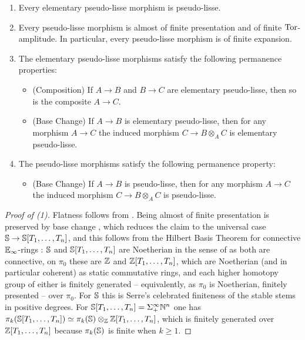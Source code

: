 \begin{proposition}\label{prop: properties of pseudo-lisse morphisms}
    \begin{enumerate}
        \item Every elementary pseudo-lisse morphism is pseudo-lisse. 
        \item Every pseudo-lisse morphism is almost of finite presentation and of finite $\mathrm{Tor}$-amplitude. In particular, every pseudo-lisse morphism is of finite expansion. 
        \item The elementary pseudo-lisse morphisms satisfy the following permanence properties: 
        \begin{itemize}
            \item [(3.1)] (Composition) If $A\to B$ and $B\to C$ are elementary pseudo-lisse, then so is the composite $A\to C$. 
            \item [(3.2)] (Base Change) If $A\to B$ is elementary pseudo-lisse, then for any morphism $A\to C$ the induced morphism $C\to B\otimes_{A}C$ is elementary pseudo-lisse. 
        \end{itemize}
        \item The pseudo-lisse morphisms satisfy the following permanence property: 
        \begin{itemize}
            \item [(4.1)] (Base Change) If $A\to B$ is pseudo-lisse, then for any morphism $A\to C$ the induced morphism $C\to B\otimes_{A}C$ is pseudo-lisse. 
        \end{itemize}
    \end{enumerate}
\end{proposition}
\begin{proof}[Proof of (1)]
    Flatness follows from \cite[Rmk. 5.4.1.2]{SAG}. Being almost of finite presentation is preserved by base change \cite[Rmk. 7.2.4.28]{HA}, which reduces the claim to the universal case $\mathbb{S}\to\mathbb{S}[T_{1},\dots,T_{n}]$, and this follows from the Hilbert Basis Theorem for connective $\mathbb{E}_{\infty}$-rings \cite[Prop. 7.2.4.31]{HA}: $\mathbb{S}$ and $\mathbb{S}[T_{1},\dots,T_{n}]$ are Noetherian in the sense of \cite[Def. 7.2.4.30]{HA} as both are connective, on $\pi_{0}$ these are $\mathbb{Z}$ and $\mathbb{Z}[T_{1},\dots,T_{n}]$, which are Noetherian (and in particular coherent) as static commutative rings, and each higher homotopy group of either is finitely generated -- equivalently, as $\pi_{0}$ is Noetherian, finitely presented -- over $\pi_{0}$. For $\mathbb{S}$ this is Serre's celebrated finiteness of the stable stems in positive degrees. For $\mathbb{S}[T_{1},\dots,T_{n}]=\Sigma^{\infty}_{+}\mathbb{N}^{n}$ one has $\pi_{k}(\mathbb{S}[T_{1},\dots,T_{n}])\simeq\pi_{k}(\mathbb{S})\otimes_{\mathbb{Z}}\mathbb{Z}[T_{1},\dots,T_{n}]$, which is finitely generated over $\mathbb{Z}[T_{1},\dots,T_{n}]$ because $\pi_{k}(\mathbb{S})$ is finite when $k\geq1$.
\end{proof}

